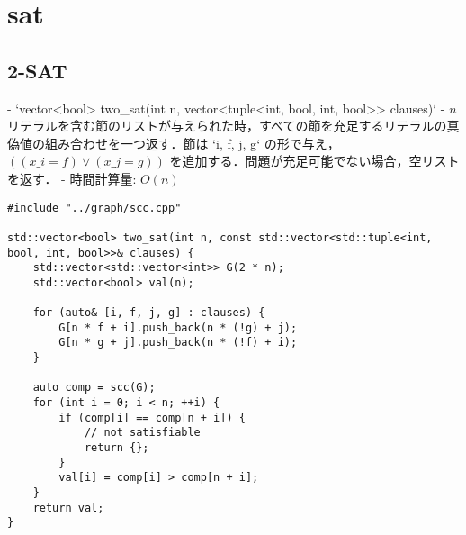 \section{sat}

\subsection{2-SAT}

\begin{small}
\begin{markdown}
- `vector<bool> two\_sat(int n, vector<tuple<int, bool, int, bool>> clauses)`
    - $n$ リテラルを含む節のリストが与えられた時，すべての節を充足するリテラルの真偽値の組み合わせを一つ返す．節は `{i, f, j, g}` の形で与え，$((x\_i = f) \lor (x\_j = g))$ を追加する．問題が充足可能でない場合，空リストを返す．
    - 時間計算量: $O(n)$
\end{markdown}
\end{small}

\begin{lstlisting}
#include "../graph/scc.cpp"

std::vector<bool> two_sat(int n, const std::vector<std::tuple<int, bool, int, bool>>& clauses) {
    std::vector<std::vector<int>> G(2 * n);
    std::vector<bool> val(n);

    for (auto& [i, f, j, g] : clauses) {
        G[n * f + i].push_back(n * (!g) + j);
        G[n * g + j].push_back(n * (!f) + i);
    }

    auto comp = scc(G);
    for (int i = 0; i < n; ++i) {
        if (comp[i] == comp[n + i]) {
            // not satisfiable
            return {};
        }
        val[i] = comp[i] > comp[n + i];
    }
    return val;
}
\end{lstlisting}